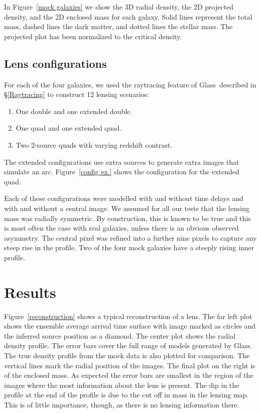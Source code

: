 \documentclass[galley,usenatbib]{mn2e}
\newcommand{\Glass}{{\sc Glass}}
\newcommand{\figref}[1] {Figure~\ref{#1}}
\newcommand{\secref}[1] {\S\ref{#1}}
\begin{document}
In \figref{mock galaxies} we show the 3D radial density, 
the 2D projected density, and the 2D enclosed mass for each
galaxy. Solid lines represent the total mass, dashed lines the dark 
matter, and dotted lines the stellar mass. The projected plot has
been normalized to the critical density.

\subsection{Lens configurations} %

For each of the four galaxies, we used the raytracing feature of \Glass\
described in \secref{Raytracing} to construct 12 lensing scenarios:

\begin{enumerate}
\item One double and one extended double.
\item One quad and one extended quad.
\item Two 2-source quads with varying redshift contrast.
\end{enumerate}

The extended configurations use extra sources to generate extra images that
simulate an arc. \figref{config ex.} shows the configuration for the extended
quad.

Each of these configurations were modelled with and without time delays and with
and without a central image. We assumed for all our tests that the lensing mass
was radially symmetric. By construction, this is known to be true and this is
most often the case with real galaxies, unless there is an obvious observed
asymmetry. The central pixel was refined into a further nine pixels to capture
any steep rise in the profile. Two of the four mock galaxies have a steeply rising
inner profile.

\section{Results}\label{sec:results}

\figref{reconstruction} shows a typical reconstruction of a
lens. The far left plot shows the ensemble average arrival time surface with
image marked as circles and the inferred source position as a diamond. The
center plot shows the radial density profile. The error bars cover the full
range of models generated by \Glass. The true density profile from the mock
data is also plotted for comparison. The vertical lines mark the radial
position of the images. The final plot on the right is of the enclosed mass. As
expected the error bars are smallest in the region of the images where the most
information about the lens is present. The dip in the profile at the end of the
profile is due to the cut off in mass in the lensing map. This is of little
importance, though, as there is no lensing information there.
\end{document}

